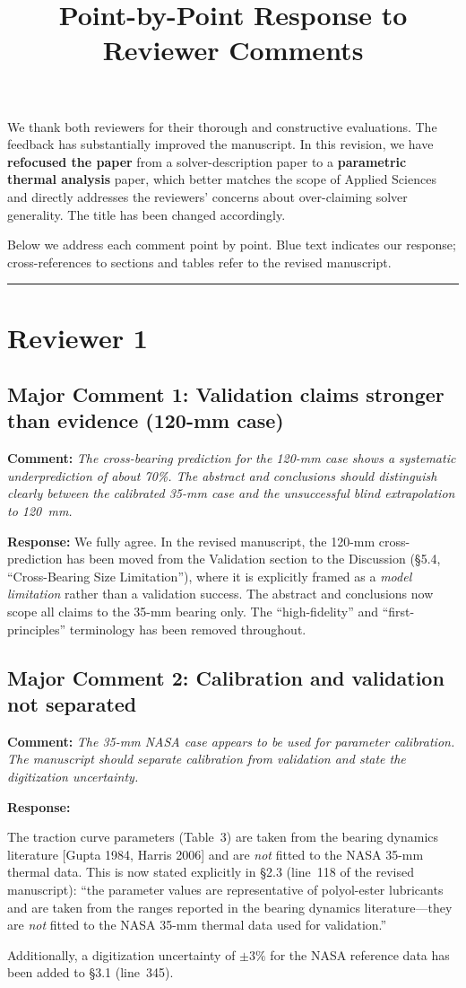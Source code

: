 \documentclass[11pt]{article}
\title{Point-by-Point Response to Reviewer Comments}
\author{}
\date{}
\newcommand{\reviewer}[1]{\subsection*{#1}}
\newcommand{\comment}[1]{\textbf{Comment:} \textit{#1}\par\medskip}
\newcommand{\response}[1]{\textbf{Response:} \textcolor{response}{#1}\par\bigskip}
\begin{document}
\maketitle

\noindent We thank both reviewers for their thorough and constructive evaluations. The feedback has substantially improved the manuscript. In this revision, we have \textbf{refocused the paper} from a solver-description paper to a \textbf{parametric thermal analysis} paper, which better matches the scope of Applied Sciences and directly addresses the reviewers' concerns about over-claiming solver generality. The title has been changed accordingly.

Below we address each comment point by point. Blue text indicates our response; cross-references to sections and tables refer to the revised manuscript.

\bigskip
\noindent\rule{\textwidth}{0.4pt}

\section*{Reviewer 1}

\reviewer{Major Comment 1: Validation claims stronger than evidence (120-mm case)}

\comment{The cross-bearing prediction for the 120-mm case shows a systematic underprediction of about 70\%. The abstract and conclusions should distinguish clearly between the calibrated 35-mm case and the unsuccessful blind extrapolation to 120~mm.}

\response{We fully agree. In the revised manuscript, the 120-mm cross-prediction has been moved from the Validation section to the Discussion (\S5.4, ``Cross-Bearing Size Limitation''), where it is explicitly framed as a \emph{model limitation} rather than a validation success. The abstract and conclusions now scope all claims to the 35-mm bearing only. The ``high-fidelity'' and ``first-principles'' terminology has been removed throughout.}


\reviewer{Major Comment 2: Calibration and validation not separated}

\comment{The 35-mm NASA case appears to be used for parameter calibration. The manuscript should separate calibration from validation and state the digitization uncertainty.}

\response{The traction curve parameters (Table~3) are taken from the bearing dynamics literature [Gupta 1984, Harris 2006] and are \emph{not} fitted to the NASA 35-mm thermal data. This is now stated explicitly in \S2.3 (line~118 of the revised manuscript): ``the parameter values are representative of polyol-ester lubricants and are taken from the ranges reported in the bearing dynamics literature---they are \emph{not} fitted to the NASA 35-mm thermal data used for validation.''

Additionally, a digitization uncertainty of $\pm 3\%$ for the NASA reference data has been added to \S3.1 (line~345).}
\end{document}
